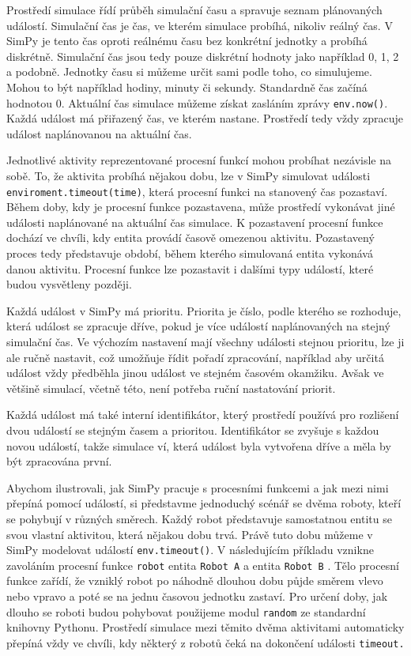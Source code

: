 \documentclass[12pt,a4paper]{article}
\begin{document}
Prostředí simulace řídí průběh simulační času a spravuje seznam plánovaných událostí. Simulační čas je čas, ve kterém simulace probíhá, nikoliv reálný čas. V SimPy je tento čas oproti reálnému času bez konkrétní jednotky a probíhá diskrétně. Simulační čas jsou tedy pouze diskrétní hodnoty jako například 0, 1, 2 a podobně. Jednotky času si můžeme určit sami podle toho, co simulujeme. Mohou to být například hodiny, minuty či sekundy. Standardně čas začíná hodnotou 0. Aktuální čas simulace můžeme získat zasláním zprávy \texttt{env.now()}. Každá událost má přiřazený čas, ve kterém nastane. Prostředí tedy vždy zpracuje událost naplánovanou na aktuální čas.

Jednotlivé aktivity reprezentované procesní funkcí mohou probíhat nezávisle na sobě. To, že aktivita probíhá nějakou dobu, lze v SimPy simulovat události \texttt{enviroment.timeout(time)}, která procesní funkci na stanovený čas pozastaví. Během doby, kdy je procesní funkce pozastavena, může prostředí vykonávat jiné události naplánované na aktuální čas simulace. K pozastavení procesní funkce dochází ve chvíli, kdy entita provádí časově omezenou aktivitu. Pozastavený proces tedy představuje období, během kterého simulovaná entita vykonává danou aktivitu. Procesní funkce lze pozastavit i dalšími typy událostí, které budou vysvětleny později.

Každá událost v SimPy má prioritu. Priorita je číslo, podle kterého se rozhoduje, která událost se zpracuje dříve, pokud je více událostí naplánovaných na stejný simulační čas.
Ve výchozím nastavení mají všechny události stejnou prioritu, lze ji ale ručně nastavit, což umožňuje řídit pořadí zpracování, například aby určitá událost vždy předběhla jinou událost ve stejném časovém okamžiku. Avšak ve většině simulací, včetně této, není potřeba ruční nastatování priorit.

Každá událost má také interní identifikátor, který prostředí používá pro rozlišení dvou událostí se stejným časem a prioritou.
Identifikátor se zvyšuje s každou novou událostí, takže simulace ví, která událost byla vytvořena dříve a měla by být zpracována první.

\noindent Abychom ilustrovali, jak SimPy pracuje s procesními funkcemi a jak mezi nimi přepíná pomocí událostí, si představme jednoduchý scénář se dvěma roboty, kteří se pohybují v různých směrech. Každý robot představuje samostatnou entitu se svou vlastní aktivitou, která nějakou dobu trvá. Právě tuto dobu můžeme v SimPy modelovat  událostí \texttt{env.timeout()}. V následujícím příkladu vznikne zavoláním procesní funkce \texttt{robot} entita \texttt{Robot A} a entita \texttt{Robot B} .
Tělo procesní funkce zařídí, že vzniklý robot po náhodně dlouhou dobu půjde směrem vlevo nebo vpravo a poté se na jednu časovou jednotku zastaví. Pro určení doby, jak dlouho se roboti budou pohybovat použijeme modul \texttt{random} ze standardní knihovny Pythonu. Prostředí simulace mezi těmito dvěma aktivitami automaticky přepíná vždy ve chvíli, kdy některý z robotů čeká na dokončení události \texttt{timeout.}
\end{document}
